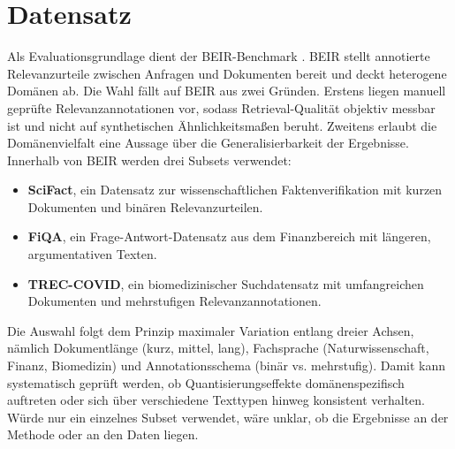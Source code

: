 \section{Datensatz}
%
Als Evaluationsgrundlage dient der BEIR-Benchmark \cite{thakur_2021_beir}.
BEIR stellt annotierte Relevanzurteile zwischen Anfragen und Dokumenten bereit und deckt heterogene Domänen ab.
Die Wahl fällt auf BEIR aus zwei Gründen.
Erstens liegen manuell geprüfte Relevanzannotationen vor, sodass Retrieval-Qualität objektiv messbar ist und nicht auf synthetischen Ähnlichkeitsmaßen beruht.
Zweitens erlaubt die Domänenvielfalt eine Aussage über die Generalisierbarkeit der Ergebnisse.
%
Innerhalb von BEIR werden drei Subsets verwendet:
\begin{itemize}
  \item \textbf{SciFact}, ein Datensatz zur wissenschaftlichen Faktenverifikation mit kurzen Dokumenten und binären Relevanzurteilen.
  \item \textbf{FiQA}, ein Frage-Antwort-Datensatz aus dem Finanzbereich mit längeren, argumentativen Texten.
  \item \textbf{TREC-COVID}, ein biomedizinischer Suchdatensatz mit umfangreichen Dokumenten und mehrstufigen Relevanzannotationen.
\end{itemize}
%
Die Auswahl folgt dem Prinzip maximaler Variation entlang dreier Achsen, nämlich Dokumentlänge (kurz, mittel, lang), Fachsprache (Naturwissenschaft, Finanz, Biomedizin) und Annotationsschema (binär vs. mehrstufig).
Damit kann systematisch geprüft werden, ob Quantisierungseffekte domänenspezifisch auftreten oder sich über verschiedene Texttypen hinweg konsistent verhalten.
Würde nur ein einzelnes Subset verwendet, wäre unklar, ob die Ergebnisse an der Methode oder an den Daten liegen.
%
